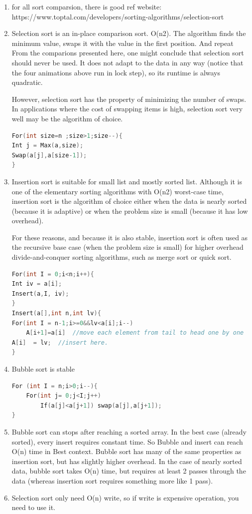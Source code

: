 \documentclass[a4paper,12pt,twoside]{book}
\begin{document}
\begin{enumerate}
\item for all sort comparsion, there is good ref website: https://www.toptal.com/developers/sorting-algorithms/selection-sort

\item Selection sort is an in-place comparison sort. O(n2). The algorithm finds the minimum value, swaps it with the value in the first position.  And repeat From the comparions presented here, one might conclude that selection sort should never be used. It does not adapt to the data in any way (notice that the four animations above run in lock step), so its runtime is always quadratic.

However, selection sort has the property of minimizing the number of swaps. In applications where the cost of swapping items is high, selection sort very well may be the algorithm of choice.
\begin{lstlisting}[frame=single, language=c++]
For(int size=n ;size>1;size--){
Int j = Max(a,size);
Swap(a[j],a[size-1]);
}
\end{lstlisting}

\item Insertion sort is suitable for small list and mostly sorted list. Although it is one of the elementary sorting algorithms with O(n2) worst-case time, insertion sort is the algorithm of choice either when the data is nearly sorted (because it is adaptive) or when the problem size is small (because it has low overhead).

For these reasons, and because it is also stable, insertion sort is often used as the recursive base case (when the problem size is small) for higher overhead divide-and-conquer sorting algorithms, such as merge sort or quick sort.

\begin{lstlisting}[frame=single, language=c++]
For(int I = 0;i<n;i++){
Int iv = a[i];
Insert(a,I, iv);
}
Insert(a[],int n,int lv){
For(int I = n-1;i>=0&&lv<a[i];i--)
    A[i+1]=a[i]  //move each element from tail to head one by one
A[i]  = lv;  //insert here. 
}
\end{lstlisting}

\item Bubble sort is stable 
\begin{lstlisting}[frame=single, language=c++]
For (int I = n;i>0;i--){
	For(int j= 0;j<I;j++)
		If(a[j]<a[j+1]) swap(a[j],a[j+1]);
}
\end{lstlisting}

\item Bubble sort can stops after reaching a sorted array. In the best case (already sorted), every insert requires constant time. So Bubble and insert can reach O(n) time in Best context. Bubble sort has many of the same properties as insertion sort, but has slightly higher overhead. In the case of nearly sorted data, bubble sort takes O(n) time, but requires at least 2 passes through the data (whereas insertion sort requires something more like 1 pass).

\item Selection sort only need O(n) write, so if write is expensive operation, you need to use it. 
\end{enumerate}  
\end{document}
